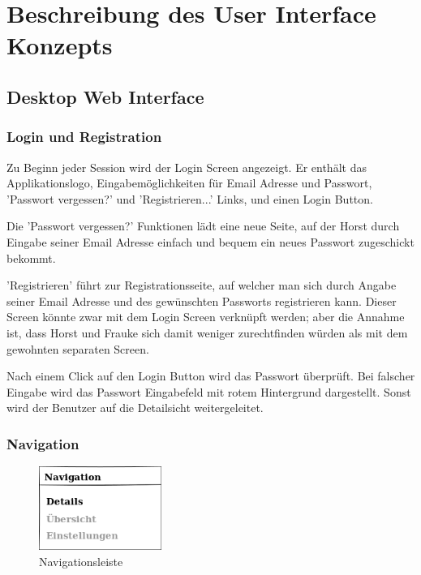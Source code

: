\section{Beschreibung des User Interface Konzepts}

\subsection{Desktop Web Interface}

\subsubsection{Login und Registration} \label{subsubsection:login}

Zu Beginn jeder Session wird der Login Screen angezeigt. Er enth\"alt das
Applikationslogo, Eingabem\"oglichkeiten f\"ur Email Adresse und Passwort,
'Passwort vergessen?'  und 'Registrieren...'  Links, und einen Login Button.

Die 'Passwort vergessen?'  Funktionen l\"adt eine neue Seite, auf der Horst
durch Eingabe seiner Email Adresse einfach und bequem ein neues Passwort
zugeschickt bekommt.

'Registrieren'  f\"uhrt zur Registrationsseite, auf welcher man sich durch
Angabe seiner Email Adresse und des gew\"unschten Passworts registrieren kann.
Dieser Screen k\"onnte zwar mit dem Login Screen verkn\"upft werden; aber die
Annahme ist, dass Horst und Frauke sich damit weniger zurechtfinden w\"urden
als mit dem gewohnten separaten Screen.

Nach einem Click auf den Login Button wird das Passwort \"uberpr\"uft. 
Bei falscher Eingabe wird das Passwort Eingabefeld mit rotem Hintergrund
dargestellt. Sonst wird der Benutzer auf die Detailsicht weitergeleitet.

\subsubsection{Navigation} \label{subsubsection:navigation}

\begin{figure}[htl]
\centering
\includegraphics[width=4cm]{img/web_navigation}
\caption{Navigationsleiste}
\label{fig:web_navigation}
\end{figure}

